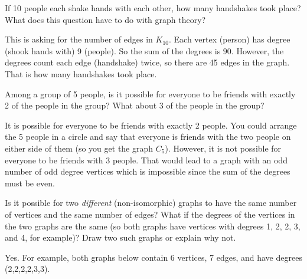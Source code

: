 \begin{questions}
\question If 10 people each shake hands with each other, how many handshakes took place?  What does this question have to do with graph theory?

	\begin{answer}
		This is asking for the number of edges in $K_{10}$.  Each vertex (person) has degree (shook hands with) 9 (people).  So the sum of the degrees is $90$.  However, the degrees count each edge (handshake) twice, so there are 45 edges in the graph.  That is how many handshakes took place.%
	\end{answer}
	
	
	

\question Among a group of 5 people, is it possible for everyone to be friends with exactly 2 of the people in the group?  What about 3 of the people in the group?

	\begin{answer}
		It is possible for everyone to be friends with exactly 2 people.  You could arrange the 5 people in a circle and say that everyone is friends with the two people on either side of them (so you get the graph $C_5$).  However, it is not possible for everyone to be friends with 3 people.  That would lead to a graph with an odd number of odd degree vertices which is impossible since the sum of the degrees must be even.  %
	\end{answer}
	
	



\question Is it possible for two {\em different} (non-isomorphic) graphs to have the same number of vertices and the same number of edges?  What if the degrees of the vertices in the two graphs are the same (so both graphs have vertices with degrees 1, 2, 2, 3, and 4, for example)?  Draw two such graphs or explain why not.

	\begin{answer}
		Yes.  For example, both graphs below contain 6 vertices, 7 edges, and have degrees (2,2,2,2,3,3).
		\begin{center}
		  \hfill
		  \hfill
		  \hfill ~
		\end{center}
	\end{answer}
	

\end{questions}
